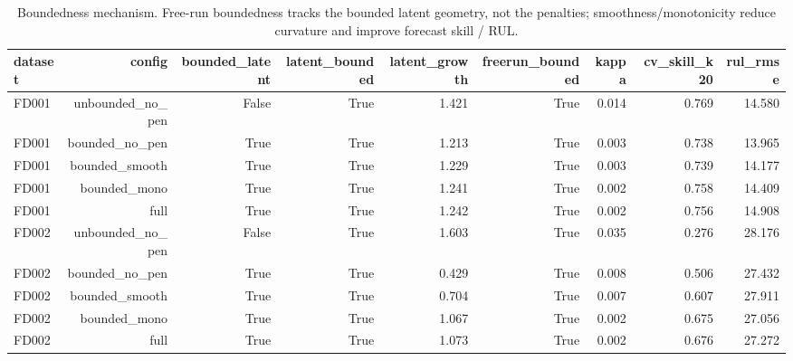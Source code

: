 \begin{table}[t]
\centering
\caption{Boundedness mechanism. Free-run boundedness tracks the bounded latent geometry, not the penalties; smoothness/monotonicity reduce curvature and improve forecast skill / RUL.}
\label{tab:boundedness_mechanism}
\begin{tabular}{lrrrrrrrr}
\toprule
dataset & config & bounded\_latent & latent\_bounded & latent\_growth & freerun\_bounded & kappa & cv\_skill\_k20 & rul\_rmse \\
\midrule
FD001 & unbounded\_no\_pen & False & True & 1.421 & True & 0.014 & 0.769 & 14.580 \\
FD001 & bounded\_no\_pen & True & True & 1.213 & True & 0.003 & 0.738 & 13.965 \\
FD001 & bounded\_smooth & True & True & 1.229 & True & 0.003 & 0.739 & 14.177 \\
FD001 & bounded\_mono & True & True & 1.241 & True & 0.002 & 0.758 & 14.409 \\
FD001 & full & True & True & 1.242 & True & 0.002 & 0.756 & 14.908 \\
FD002 & unbounded\_no\_pen & False & True & 1.603 & True & 0.035 & 0.276 & 28.176 \\
FD002 & bounded\_no\_pen & True & True & 0.429 & True & 0.008 & 0.506 & 27.432 \\
FD002 & bounded\_smooth & True & True & 0.704 & True & 0.007 & 0.607 & 27.911 \\
FD002 & bounded\_mono & True & True & 1.067 & True & 0.002 & 0.675 & 27.056 \\
FD002 & full & True & True & 1.073 & True & 0.002 & 0.676 & 27.272 \\
\bottomrule
\end{tabular}
\end{table}